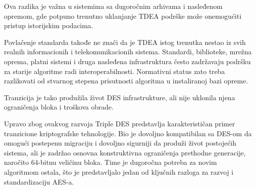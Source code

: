 Ova razlika je važna u sistemima sa dugoročnim arhivama i nasleđenom
opremom, gde potpuno trenutno uklanjanje TDEA podrške može onemogućiti
pristup istorijskim podacima.

Povlačenje standarda takođe ne znači da je TDEA istog trenutka nestao
iz svih realnih informacionih i telekomunikacionih sistema. Standardi,
biblioteke, mrežna oprema, platni sistemi i druga nasleđena infrastruktura
često zadržavaju podršku za starije algoritme radi interoperabilnosti.
Normativni status zato treba razlikovati od stvarnog stepena prisutnosti
algoritma u instaliranoj bazi opreme.

Tranzicija je tako produžila život DES infrastrukture, ali nije
uklonila njena ograničenja bloka i troškova obrade.

Upravo zbog ovakvog razvoja Triple DES predstavlja karakterističan
primer tranzicione kriptografske tehnologije. Bio je dovoljno
kompatibilan sa DES-om da omogući postepenu migraciju i dovoljno
sigurniji da produži život postojećih sistema, ali je zadržao osnovna
konstruktivna ograničenja prethodne generacije, naročito 64-bitnu
veličinu bloka. Time je dugoročna potreba za novim algoritmom ostala,
što je predstavljalo jedan od ključnih razloga za razvoj i
standardizaciju AES-a.
